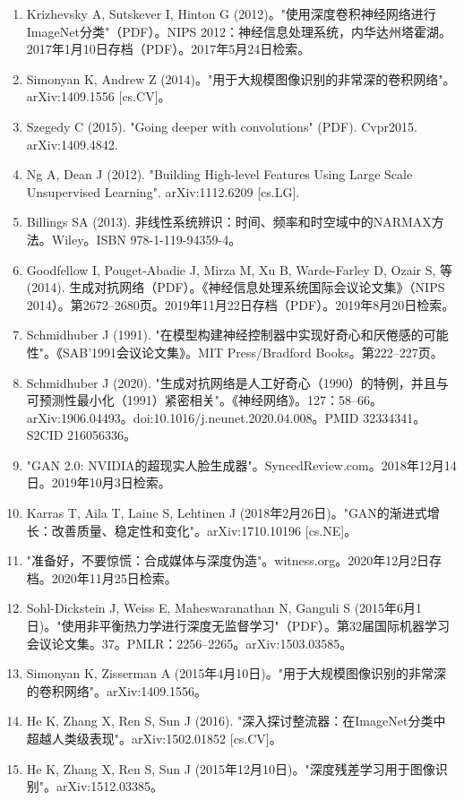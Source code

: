 \begin{enumerate}
\item Krizhevsky A, Sutskever I, Hinton G (2012)。"使用深度卷积神经网络进行ImageNet分类"（PDF）。NIPS 2012：神经信息处理系统，内华达州塔霍湖。2017年1月10日存档（PDF）。2017年5月24日检索。
\item Simonyan K, Andrew Z (2014)。"用于大规模图像识别的非常深的卷积网络"。arXiv:1409.1556 [cs.CV]。
\item Szegedy C (2015). "Going deeper with convolutions" (PDF). Cvpr2015. arXiv:1409.4842.
\item Ng A, Dean J (2012). "Building High-level Features Using Large Scale Unsupervised Learning". arXiv:1112.6209 [cs.LG].
\item Billings SA (2013). 非线性系统辨识：时间、频率和时空域中的NARMAX方法。Wiley。ISBN 978-1-119-94359-4。
\item Goodfellow I, Pouget-Abadie J, Mirza M, Xu B, Warde-Farley D, Ozair S, 等 (2014). 生成对抗网络（PDF）。《神经信息处理系统国际会议论文集》（NIPS 2014）。第2672–2680页。2019年11月22日存档（PDF）。2019年8月20日检索。
\item Schmidhuber J (1991). "在模型构建神经控制器中实现好奇心和厌倦感的可能性"。《SAB'1991会议论文集》。MIT Press/Bradford Books。第222–227页。
\item Schmidhuber J (2020). "生成对抗网络是人工好奇心（1990）的特例，并且与可预测性最小化（1991）紧密相关"。《神经网络》。127：58–66。arXiv:1906.04493。doi:10.1016/j.neunet.2020.04.008。PMID 32334341。S2CID 216056336。
\item "GAN 2.0: NVIDIA的超现实人脸生成器"。SyncedReview.com。2018年12月14日。2019年10月3日检索。
\item Karras T, Aila T, Laine S, Lehtinen J (2018年2月26日)。"GAN的渐进式增长：改善质量、稳定性和变化"。arXiv:1710.10196 [cs.NE]。
\item "准备好，不要惊慌：合成媒体与深度伪造"。witness.org。2020年12月2日存档。2020年11月25日检索。
\item Sohl-Dickstein J, Weiss E, Maheswaranathan N, Ganguli S (2015年6月1日)。"使用非平衡热力学进行深度无监督学习"（PDF）。第32届国际机器学习会议论文集。37。PMLR：2256–2265。arXiv:1503.03585。
\item Simonyan K, Zisserman A (2015年4月10日)。"用于大规模图像识别的非常深的卷积网络"。arXiv:1409.1556。
\item He K, Zhang X, Ren S, Sun J (2016). "深入探讨整流器：在ImageNet分类中超越人类级表现"。arXiv:1502.01852 [cs.CV]。
\item He K, Zhang X, Ren S, Sun J (2015年12月10日)。"深度残差学习用于图像识别"。arXiv:1512.03385。

\end{enumerate}
